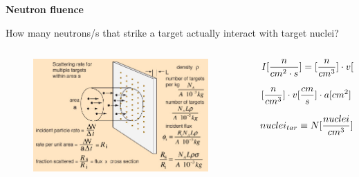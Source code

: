 \documentclass[aspectratio=1610,pdftex,dvipsnames,compress,xcolor={dvipsnames}]{beamer}
\begin{document}
\begin{frame}[plain]{}
    \centering\LARGE\textbf{Neutron fluence}
\end{frame}


\addtocounter{framenumber}{-1} 
\begin{frame}{How many neutrons/s that strike a target actually interact with target nuclei?}
    \begin{columns}[t]

        \begin{column}{0.55\textwidth}
            \begin{figure}
                \centering
                \includegraphics[width=0.95\textwidth]{flux.jpg}
            \end{figure}
        \end{column}

        \begin{column}{0.45\textwidth}
            \begin{equation}
                \small
                I[\frac{n}{cm^2 \cdot s}]=[\frac{n}{cm^3}] \cdot v[\frac{cm}{s}]
            \end{equation}

            \begin{equation}
                \small
                [\frac{n}{cm^3}] \cdot v[\frac{cm}{s}] \cdot a[cm^2]=\frac{n}{s}
            \end{equation}

            \begin{equation}
                \small
                nuclei_{tar} \equiv N[\frac{nuclei}{cm^3}] \cdot a[cm^2] \cdot L[cm]
            \end{equation}


\end{column}
\end{columns}
\end{frame}
\end{document}
